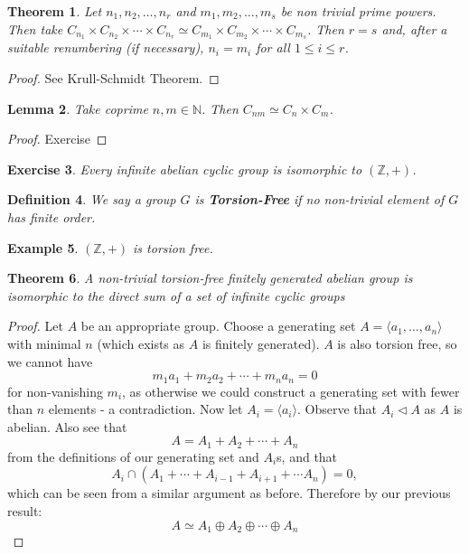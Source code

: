 \documentclass[a4paper,10pt]{article}
\newcommand{\NN}{\mathbb{N}}
\newcommand{\ZZ}{\mathbb{Z}}
\newtheorem{thm}{Theorem}
\newtheorem{Def}[thm]{Definition}
\newtheorem{eg}[thm]{Example}
\newtheorem{Ex}[thm]{Exercise}
\newtheorem{Lem}[thm]{Lemma}
\begin{document}
\begin{thm}
Let $n_1, n_2, \dots, n_r$ and $m_1, m_2, \dots, m_s$ be non trivial prime powers. Then take $C_{n_1} \times C_{n_2} \times \cdots \times C_{n_r} \simeq C_{m_1} \times C_{m_2} \times \cdots \times C_{m_s}$. Then $r = s$ and, after a suitable renumbering (if necessary), $n_i = m_i$ for all $1 \leq i \leq r$. 
\end{thm}
\begin{proof}
See Krull-Schmidt Theorem.
\end{proof}


\begin{Lem}
Take coprime $n,m \in \NN$. Then $C_{nm} \simeq C_n \times C_m$.
\end{Lem}
\begin{proof}
Exercise
\end{proof}

\begin{Ex}
Every infinite abelian cyclic group is isomorphic to $(\ZZ, +)$. 
\end{Ex}

\begin{Def}
We say a group $G$ is \textbf{Torsion-Free} if no non-trivial element of $G$ has finite order. 
\end{Def}
\begin{eg}
$(\ZZ, +)$ is torsion free.
\end{eg}

\begin{thm}
A non-trivial torsion-free finitely generated abelian group is isomorphic to the direct sum of a set of infinite cyclic groups
\end{thm}

\begin{proof}
Let $A$ be an appropriate group. Choose a generating set $A = \langle a_1, \dots, a_n \rangle$ with minimal $n$ (which exists as $A$ is finitely generated). $A$ is also torsion free, so we cannot have
\[ m_1 a_1 + m_2 a_2 + \cdots + m_n a_n = 0 \]
for non-vanishing $m_i$, as otherwise we could construct a generating set with fewer than $n$ elements - a contradiction. Now let $A_i = \langle a_i \rangle$. Observe that $A_i \triangleleft A$ as $A$ is abelian. Also see that
\[ A = A_1 + A_2 + \cdots + A_n \]
from the definitions of our generating set and $A_i$s, and that 
\[ A_i \cap (A_1 + \cdots + A_{i-1} + A_{i+1} + \cdots A_n) = 0, \]
which can be seen from a similar argument as before. Therefore by our previous result:
\[ A \simeq A_1 \oplus A_2 \oplus \cdots \oplus A_n \]
\end{proof}
\end{document}
